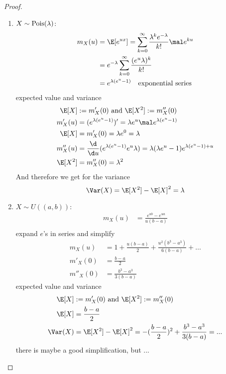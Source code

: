 \subsection{}
\begin{proof}
	\begin{enumerate}
		\item $X \sim \operatorname{Pois}(\lambda)$:
		\begin{align*}
			m_X(u) &= \E[e^{ux}] = \sum_{k=0}^{\infty}\frac{\lambda^k e^{-\lambda}}{k!}\mal e^{ku}\\
			&= e^{-\lambda}\sum_{k=0}^{\infty} \frac{(e^u\lambda)^k}{k!}\\
			&= e^{\lambda(e^u - 1)} \quad \text{exponential series}
		\end{align*}
		expected value and variance
		\begin{align*}
			\E[X] &:= m'_X(0) \and \E[X^2] := m''_X(0)\\
			m'_X(u) &= (e^{\lambda(e^u -1)})' = \lambda e^u \mal e^{\lambda(e^u -1)}\\
			\E[X] &= m'_X(0) = \lambda e^0 = \lambda\\
			m''_X(u) &= \frac{\d}{\d u}(e^{\lambda(e^u -1)}e^u \lambda) = \lambda(\lambda e^u - 1)e^{\lambda(e^u -1)+u}\\
			\E[X^2] &= m''_X(0) = \lambda^2
		\end{align*}
		And therefore we get for the variance
		\[
			\Var(X) = \E[X^2]-\E[X]^2 = \lambda
		\]
		\item $X \sim U((a,b))$:
		\begin{align*}
			m_X(u) &= \frac{e^{ub} - e^{ua}}{u(b-a)}\\
		\end{align*}
		expand $e$'s in series and simplify
		\begin{align*}
			m_X(u) &= 1 + \frac{u(b-a)}{2} + \frac{u^2(b^3 - a^3)}{6(b-a)} + \dots\\
			m'_X(0) &= \frac{b-a}{2}\\
			m''_X(0) &= \frac{b^3 - a^3}{3(b-a)}
		\end{align*}
		expected value and variance
		\begin{align*}
			\E[X] &:= m'_X(0) \and \E[X^2] := m''_X(0)\\
			\E[X] &= \frac{b-a}{2}\\
			\Var(X) &= \E[X^2] -\E[X]^2 = -(\frac{b-a}{2})^2 + \frac{b^3 - a^3}{3(b-a)} = ... \\
		\end{align*}
		there is maybe a good simplification, but ...
	\end{enumerate}
\end{proof}

